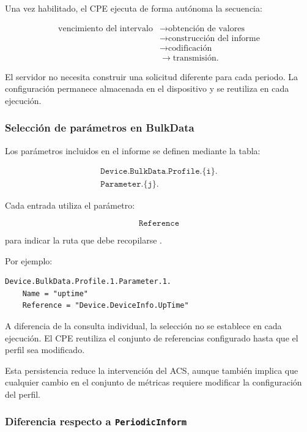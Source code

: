 Una vez habilitado, el CPE ejecuta de forma autónoma la secuencia:

\[
\begin{aligned}
    \text{vencimiento del intervalo}
    &\longrightarrow
    \text{obtención de valores}\\
    &\longrightarrow
    \text{construcción del informe}\\
    &\longrightarrow
    \text{codificación}\\
    &\longrightarrow
    \text{transmisión}.
\end{aligned}
\]

El servidor no necesita construir una solicitud diferente para cada
periodo. La configuración permanece almacenada en el dispositivo y se
reutiliza en cada ejecución.


\subsubsection*{Selección de parámetros en BulkData}

Los parámetros incluidos en el informe se definen mediante la tabla:

\[
\begin{split}
    \texttt{Device.BulkData.Profile.\{i\}.}\\
    \texttt{Parameter.\{j\}.}
\end{split}
\]

Cada entrada utiliza el parámetro:

\[
    \texttt{Reference}
\]

para indicar la ruta que debe recopilarse \cite{bbf_tr181}.

Por ejemplo:

\begin{verbatim}
Device.BulkData.Profile.1.Parameter.1.
    Name = "uptime"
    Reference = "Device.DeviceInfo.UpTime"
\end{verbatim}

A diferencia de la consulta individual, la selección no se establece en
cada ejecución. El CPE reutiliza el conjunto de referencias configurado
hasta que el perfil sea modificado.

Esta persistencia reduce la intervención del ACS, aunque también implica
que cualquier cambio en el conjunto de métricas requiere modificar la
configuración del perfil.


\subsubsection*{Diferencia respecto a \texttt{PeriodicInform}}

